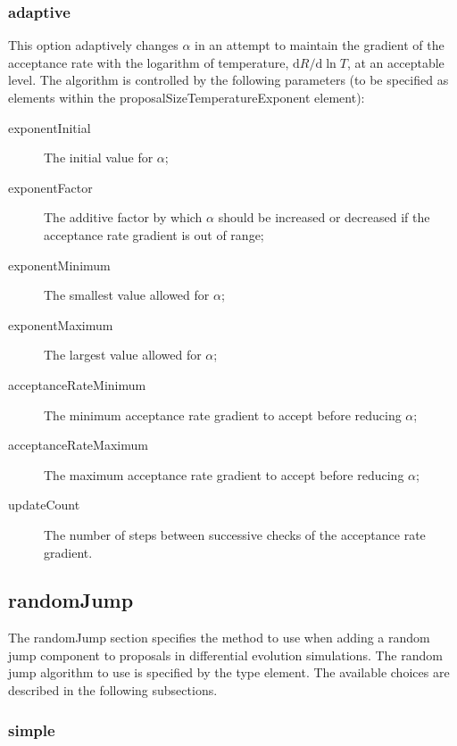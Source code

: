 \subsubsection{{\normalfont \ttfamily adaptive}}

This option adaptively changes $\alpha$ in an attempt to maintain the gradient of the acceptance rate with the logarithm of temperature, $\mathrm{d} R/\mathrm{d}\ln T$, at an acceptable level. The algorithm is controlled by the following parameters (to be specified as elements within the {\normalfont \ttfamily proposalSizeTemperatureExponent} element):
\begin{description}
\item[{\normalfont \ttfamily exponentInitial}] The initial value for $\alpha$;
\item[{\normalfont \ttfamily exponentFactor}] The additive factor by which $\alpha$ should be increased or decreased if the acceptance rate gradient is out of range;
\item[{\normalfont \ttfamily exponentMinimum}] The smallest value allowed for $\alpha$;
\item[{\normalfont \ttfamily exponentMaximum}] The largest value allowed for $\alpha$;
\item[{\normalfont \ttfamily acceptanceRateMinimum}] The minimum acceptance rate gradient to accept before reducing $\alpha$;
\item[{\normalfont \ttfamily acceptanceRateMaximum}] The maximum acceptance rate gradient to accept before reducing $\alpha$;
\item[{\normalfont \ttfamily updateCount}] The number of steps between successive checks of the acceptance rate gradient.
\end{description}


\subsection{{\normalfont \ttfamily randomJump}}

The {\normalfont \ttfamily randomJump} section specifies the method to use when adding a random jump component to proposals in differential evolution simulations. The random jump algorithm to use is specified by the {\normalfont \ttfamily type} element. The available choices are described in the following subsections.

\subsubsection{{\normalfont \ttfamily simple}}


